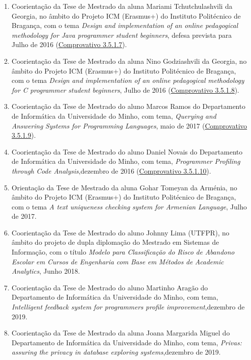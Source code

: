 \documentclass[11pt]{article}
\begin{document}
\begin{enumerate}
\item {Coorientação da Tese de Mestrado da aluna Mariami Tchutchulashvili da Georgia, no âmbito do Projeto ICM (Erasmus+) do Instituto Politécnico de Bragança, com o tema {\em{ Design and implementation of an online pedagogical methodology for Java programmer student beginners}}, defesa prevista para Julho de 2016 (\href{run:CoOrientTrabalhos/emdesenvolvimento/Mariami.pdf}{Comprovativo 3.5.1.7}).}
\item {Coorientação da Tese de Mestrado da aluna Nino Godziashvili da Georgia, no âmbito do Projeto ICM (Erasmus+) do Instituto Politécnico de Bragança, com o tema {\em{ Design and implementation of an online pedagogical methodology for C programmer student beginners}}, Julho de 2016 (\href{run:CoOrientTrabalhos/emdesenvolvimento/Nino.pdf}{Comprovativo 3.5.1.8}).}
\item {Coorientação da Tese de Mestrado do aluno Marcos Ramos do Departamento de Informática da Universidade do Minho, com tema, {\em{ Querying and Answering Systems for Programming Languages}}, maio de 2017 (\href{run:CoOrientTrabalhos/emdesenvolvimento/MarcosRamos.pdf}{Comprovativo 3.5.1.9}).}
\item {Coorientação da Tese de Mestrado do aluno Daniel Novais do Departamento de Informática da Universidade do Minho, com tema, {\em{ Programmer Profiling through Code Analysis}},dezembro de 2016 (\href{run:CoOrientTrabalhos/emdesenvolvimento/DanielNovais.pdf}{Comprovativo 3.5.1.10}).}
\item {Orientação da Tese de Mestrado da aluna Gohar Tomeyan da Arménia, no âmbito do Projeto ICM (Erasmus+) do Instituto Politécnico de Bragança, com o tema {\em{ A text uniqueness checking system for Armenian Language}}, Julho de 2017. }
\item {Coorientação da Tese de Mestrado do aluno Johnny Lima (UTFPR), no âmbito do projeto de dupla diplomação do Mestrado em Sistemas de Informação, com o título {\em{ Modelo para Classificação do Risco de Abandono Escolar em Cursos de Engenharia com Base em Métodos de Academic Analytics}}, Junho 2018.}
\item {Coorientação da Tese de Mestrado do aluno Martinho Aragão do Departamento de Informática da Universidade do Minho, com tema, {\em{ Intelligent feedback system for programmers profile improvement}},dezembro de 2019.}
\item {Coorientação da Tese de Mestrado da aluna Joana Margarida Miguel do Departamento de Informática da Universidade do Minho, com tema, {\em{ Privas: assuring the privacy in database exploring systems}},dezembro de 2019.}

\end{enumerate}
\end{document}
